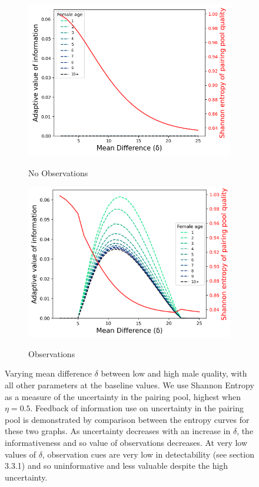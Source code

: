 \documentclass[10pt]{article} %
\begin{document}
\begin{figure}
	\centering
	\begin{subfigure}{.5\textwidth}
		\centering
		\caption{No Observations}
		\includegraphics[width=1.\linewidth]{../results/Mean0/canons.png}
		\label{fig:sub1}
	\end{subfigure}%
	\begin{subfigure}{.5\textwidth}
		\centering
		\caption{Observations}
		\includegraphics[width=1.\linewidth]{../results/Mean2/canons.png}
		\label{fig:sub2}%
	\end{subfigure}%
	\caption{Varying mean difference $\delta$ between low and high male quality, with all other parameters at the baseline values. We use Shannon Entropy as a measure of the uncertainty in the pairing pool, highest when $\eta = 0.5$. Feedback of information use on uncertainty in the pairing pool is demonstrated by comparison between the entropy curves for these two graphs. As uncertainty decreases with an increase in $\delta$, the informativeness and so value of observations decreases. At very low values of $\delta$, observation cues are very low in detectability (see section 3.3.1) and so uninformative and less valuable despite the high uncertainty.}\label{figLabel}
	\label{fig:3}%
\end{figure}
\end{document}
